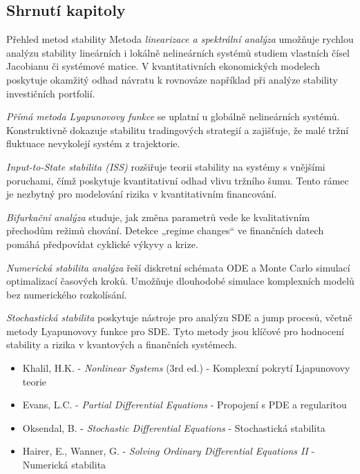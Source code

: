 \spc

\subsection*{Shrnutí kapitoly}

\begin{paragraph}{Přehled metod stability}
    Metoda \emph{linearizace a spektrální analýza} umožňuje rychlou analýzu stability lineárních i lokálně nelineárních systémů studiem vlastních čísel Jacobianu či systémové matice. V kvantitativních ekonomických modelech poskytuje okamžitý odhad návratu k rovnováze například při analýze stability investičních portfolií.
    
    \medskip
    
    \emph{Přímá metoda Lyapunovovy funkce} se uplatní u globálně nelineárních systémů. Konstruktivně dokazuje stabilitu tradingových strategií a zajišťuje, že malé tržní fluktuace nevykolejí systém z trajektorie.
    
    \medskip
    
    \emph{Input-to-State stabilita (ISS)} rozšiřuje teorii stability na systémy s vnějšími poruchami, čímž poskytuje kvantitativní odhad vlivu tržního šumu. Tento rámec je nezbytný pro modelování rizika v kvantitativním financování.
    
    \medskip
    
    \emph{Bifurkační analýza} studuje, jak změna parametrů vede ke kvalitativním přechodům režimů chování. Detekce „regime changes“ ve finančních datech pomáhá předpovídat cyklické výkyvy a krize.
    
    \medskip
    
    \emph{Numerická stabilita analýza} řeší diskretní schémata ODE a Monte Carlo simulací optimalizací časových kroků. Umožňuje dlouhodobé simulace komplexních modelů bez numerického rozkolísání.
    
    \medskip
    
    \emph{Stochastická stabilita} poskytuje nástroje pro analýzu SDE a jump procesů, včetně metody Lyapunovovy funkce pro SDE. Tyto metody jsou klíčové pro hodnocení stability a rizika v kvantových a finančních systémech.
    \end{paragraph}
\begin{itemize}
\item Khalil, H.K. - \emph{Nonlinear Systems} (3rd ed.) - Komplexní pokrytí Ljapunovovy teorie
\item Evans, L.C. - \emph{Partial Differential Equations} - Propojení s PDE a regularitou
\item Oksendal, B. - \emph{Stochastic Differential Equations} - Stochastická stabilita
\item Hairer, E., Wanner, G. - \emph{Solving Ordinary Differential Equations II} - Numerická stabilita
\end{itemize}
